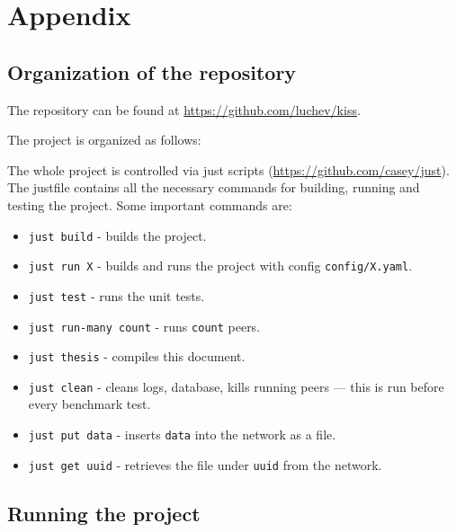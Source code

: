 \appendix
\chapter{Appendix}
\label{appendix}

\section{Organization of the repository}

The repository can be found at \url{https://github.com/luchev/kiss}.

The project is organized as follows:


The whole project is controlled via just scripts (\url{https://github.com/casey/just}).
The justfile contains all the necessary commands for building, running and testing the project.
Some important commands are:
\begin{itemize}
    \item \texttt{just build} - builds the project.
    \item \texttt{just run X} - builds and runs the project with config \texttt{config/X.yaml}.
    \item \texttt{just test} - runs the unit tests.
    \item \texttt{just run-many count} - runs \texttt{count} peers.
    \item \texttt{just thesis} - compiles this document.
    \item \texttt{just clean} - cleans logs, database, kills running peers --- this is run before every benchmark test.
    \item \texttt{just put data} - inserts \texttt{data} into the network as a file.
    \item \texttt{just get uuid} - retrieves the file under \texttt{uuid} from the network.
\end{itemize}

\section{Running the project}

